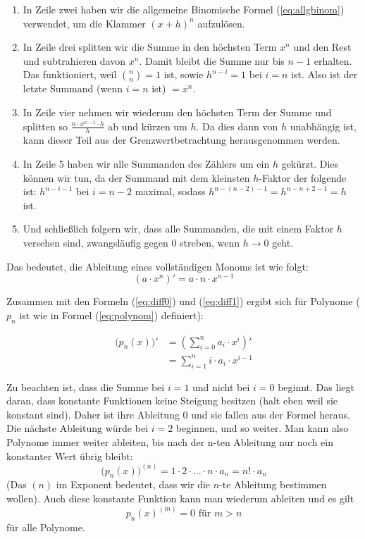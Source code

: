 \begin{enumerate}
\item In Zeile zwei haben wir die allgemeine Binomische Formel (\ref{eq:allgbinom}) verwendet, um die Klammer $(x+h)^n$ aufzulösen.
\item In Zeile drei splitten wir die Summe in den höchsten Term $x^n$ und den Rest und subtrahieren davon $x^n$. Damit bleibt die Summe nur bis $n-1$ erhalten. Das funktioniert, weil $\binom{n}{n}=1$ ist, sowie $h^{n-i}=1$ bei $i=n$ ist. Also ist der letzte Summand (wenn $i=n$ ist) $=x^n$.
\item In Zeile vier nehmen wir wiederum den höchsten Term der Summe und splitten so $\frac{n\cdot x^{n-1}\cdot h}{h}$ ab und kürzen um $h$. Da dies dann von $h$ unabhängig ist, kann dieser Teil aus der Grenzwertbetrachtung herausgenommen werden.
\item In Zeile 5 haben wir alle Summanden des Zählers um ein $h$ gekürzt. Dies können wir tun, da der Summand mit dem kleinsten $h$-Faktor der folgende ist: $h^{n-i-1}$ bei $i=n-2$ maximal, sodass $h^{n-(n-2)-1}=h^{n-n+2-1}=h$ ist.
\item Und schließlich folgern wir, dass alle Summanden, die mit einem Faktor $h$ versehen sind, zwangsläufig gegen 0 streben, wenn $h\rightarrow 0$ geht. 
\end{enumerate}

\noindent Das bedeutet, die Ableitung eines vollständigen Monoms ist wie folgt:
\begin{equation}
\left( a\cdot x^n \right)' = a\cdot n\cdot x^{n-1}
\end{equation}


Zusammen mit den Formeln (\ref{eq:diff0}) und (\ref{eq:diff1}) ergibt sich für Polynome ($p_n$ ist wie in Formel (\ref{eq:polynom}) definiert):

\begin{equation}
\begin{split}
\big( p_n(x) \big)' &= \left( \sum_{i=0}^{n} a_i \cdot x^i \right)' \\
&= \sum_{i=1}^{n} i\cdot a_i \cdot x^{i-1}
\end{split}
\end{equation}

Zu beachten ist, dass die Summe bei $i=1$ und nicht bei $i=0$ beginnt. Das liegt daran, dass konstante Funktionen keine Steigung besitzen (halt eben weil sie konstant sind). Daher ist ihre Ableitung 0 und sie fallen aus der Formel heraus. Die nächste Ableitung würde bei $i=2$ beginnen, und so weiter. Man kann also Polynome immer weiter ableiten, bis nach der n-ten Ableitung nur noch ein konstanter Wert übrig bleibt:
\begin{equation*}
\big( p_n(x)\big)^{(n)} = 1\cdot 2 \cdot \dots \cdot n \cdot a_n = n! \cdot a_n
\end{equation*}
(Das $(n)$ im Exponent bedeutet, dass wir die $n$-te Ableitung bestimmen wollen). Auch diese konstante Funktion kann man wiederum ableiten und es gilt 
\begin{equation*}
p_n(x)^{(m)} = 0 \text{ für } m>n
\end{equation*}
für alle Polynome.

